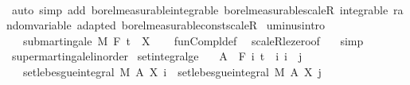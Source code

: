 \begin{isabellebody}
\ \ \isacommand{{\isacharbraceright}{\kern0pt}}\isamarkupfalse%
\isanewline
{}\isamarkupfalse%
\ {\isacharparenleft}{\kern0pt}auto\ simp\ add{\isacharcolon}{\kern0pt}\ borel{\isacharunderscore}{\kern0pt}measurable{\isacharunderscore}{\kern0pt}integrable\ borel{\isacharunderscore}{\kern0pt}measurable{\isacharunderscore}{\kern0pt}scaleR\ integrable\ random{\isacharunderscore}{\kern0pt}variable\ adapted\ borel{\isacharunderscore}{\kern0pt}measurable{\isacharunderscore}{\kern0pt}const{\isacharunderscore}{\kern0pt}scaleR{\isacharparenright}{\kern0pt}%
\endisatagproof
{\isafoldproof}%
%
\isadelimproof
\isanewline
%
\endisadelimproof
\isanewline
{}\isamarkupfalse%
\ uminus{\isacharbrackleft}{\kern0pt}intro{\isacharbrackright}{\kern0pt}{\isacharcolon}{\kern0pt}\isanewline
\ \ \ {\isachardoublequoteopen}submartingale\ M\ F\ t\ {\isacharparenleft}{\kern0pt}{\isacharminus}{\kern0pt}\ X{\isacharparenright}{\kern0pt}{\isachardoublequoteclose}\isanewline
%
\isadelimproof
\ \ %
\endisadelimproof
%
\isatagproof
{}\isamarkupfalse%
\ fun{\isacharunderscore}{\kern0pt}Compl{\isacharunderscore}{\kern0pt}def\ \isamarkupfalse%
\ scaleR{\isacharunderscore}{\kern0pt}le{\isacharunderscore}{\kern0pt}zero{\isacharbrackleft}{\kern0pt}of\ {\isachardoublequoteopen}{\isacharminus}{\kern0pt}{}{\isachardoublequoteclose}{\isacharbrackright}{\kern0pt}\ \isamarkupfalse%
\ simp%
\endisatagproof
{\isafoldproof}%
%
\isadelimproof
\isanewline
%
\endisadelimproof
\isanewline
{}\isamarkupfalse%
\isanewline
\isanewline
{}\isamarkupfalse%
\ supermartingale{\isacharunderscore}{\kern0pt}linorder\isanewline
{}\isanewline
\isanewline
{}\isamarkupfalse%
\ set{\isacharunderscore}{\kern0pt}integral{\isacharunderscore}{\kern0pt}ge{\isacharcolon}{\kern0pt}\isanewline
\ \ \ {\isachardoublequoteopen}A\ {\isasymin}\ F\ i{\isachardoublequoteclose}\ {\isachardoublequoteopen}t\ {\isasymle}\ i{\isachardoublequoteclose}\ {\isachardoublequoteopen}i\ {\isasymle}\ j{\isachardoublequoteclose}\isanewline
\ \ \ {\isachardoublequoteopen}set{\isacharunderscore}{\kern0pt}lebesgue{\isacharunderscore}{\kern0pt}integral\ M\ A\ {\isacharparenleft}{\kern0pt}X\ i{\isacharparenright}{\kern0pt}\ {\isasymge}\ set{\isacharunderscore}{\kern0pt}lebesgue{\isacharunderscore}{\kern0pt}integral\ M\ A\ {\isacharparenleft}{\kern0pt}X\ j{\isacharparenright}{\kern0pt}{\isachardoublequoteclose}\isanewline

\end{isabellebody}
